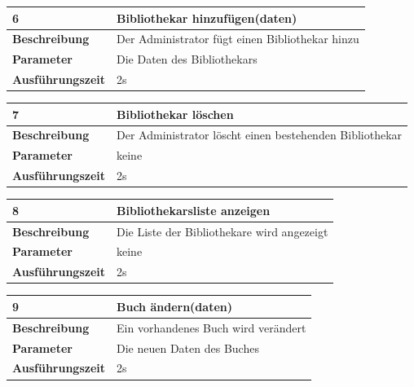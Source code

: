 \documentclass[fontsize=12pt,paper=a4,twoside]{scrartcl}
\begin{document}
\begin{table}[htbp]
    \label{a6}
    \begin{tabular}{|l|p{10cm}|}
    \hline 
    \textbf{6} & \textbf{Bibliothekar hinzufügen(daten)} \\ \hline
    \textbf{Beschreibung} & Der Administrator fügt einen Bibliothekar hinzu\\ \hline
    \textbf{Parameter} & Die Daten des Bibliothekars \\ \hline
    \textbf{Ausführungszeit} & 2s\\ \hline
    \end{tabular}
    \end{table}
    
  \begin{table}[htbp]
  \label{a7}
  \begin{tabular}{|l|p{10cm}|}
  \hline 
  \textbf{7} & \textbf{Bibliothekar löschen} \\ \hline
  \textbf{Beschreibung} & Der Administrator löscht einen bestehenden Bibliothekar\\ \hline
  \textbf{Parameter} & keine \\ \hline
  \textbf{Ausführungszeit} & 2s\\ \hline
  \end{tabular}
  \end{table}

  \begin{table}[htbp]
  \label{a8}
  \begin{tabular}{|l|p{10cm}|}
  \hline 
  \textbf{8} & \textbf{Bibliothekarsliste anzeigen} \\ \hline
  \textbf{Beschreibung} & Die Liste der Bibliothekare wird angezeigt\\ \hline
  \textbf{Parameter} & keine \\ \hline
  \textbf{Ausführungszeit} & 2s\\ \hline
  \end{tabular}
  \end{table}

  \begin{table}[htbp]
  \label{a9}
  \begin{tabular}{|l|p{10cm}|}
  \hline 
  \textbf{9} & \textbf{Buch ändern(daten)} \\ \hline
  \textbf{Beschreibung} & Ein vorhandenes Buch wird verändert \\ \hline
  \textbf{Parameter} & Die neuen Daten des Buches \\ \hline
  \textbf{Ausführungszeit} & 2s\\ \hline
  \end{tabular}
  \end{table}
\end{document}
